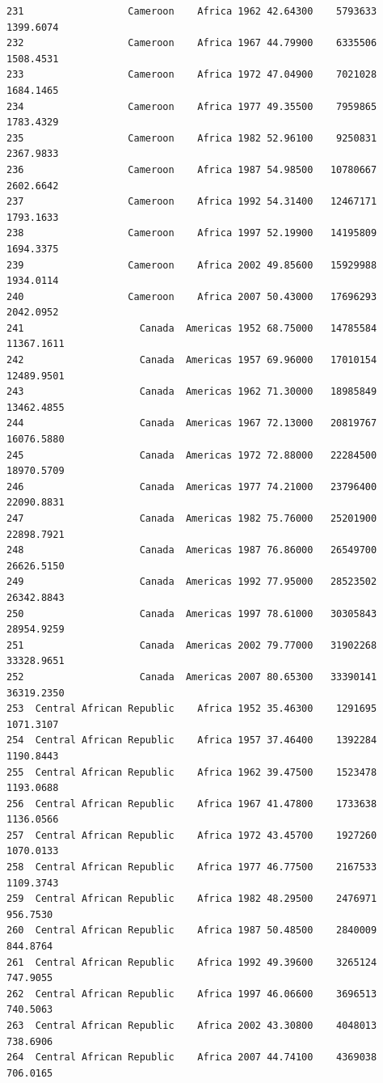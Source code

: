 \documentclass[
  letterpaper,
  DIV=11,
  numbers=noendperiod]{scrreprt}
\begin{document}
\begin{verbatim}
231                  Cameroon    Africa 1962 42.64300    5793633   1399.6074
232                  Cameroon    Africa 1967 44.79900    6335506   1508.4531
233                  Cameroon    Africa 1972 47.04900    7021028   1684.1465
234                  Cameroon    Africa 1977 49.35500    7959865   1783.4329
235                  Cameroon    Africa 1982 52.96100    9250831   2367.9833
236                  Cameroon    Africa 1987 54.98500   10780667   2602.6642
237                  Cameroon    Africa 1992 54.31400   12467171   1793.1633
238                  Cameroon    Africa 1997 52.19900   14195809   1694.3375
239                  Cameroon    Africa 2002 49.85600   15929988   1934.0114
240                  Cameroon    Africa 2007 50.43000   17696293   2042.0952
241                    Canada  Americas 1952 68.75000   14785584  11367.1611
242                    Canada  Americas 1957 69.96000   17010154  12489.9501
243                    Canada  Americas 1962 71.30000   18985849  13462.4855
244                    Canada  Americas 1967 72.13000   20819767  16076.5880
245                    Canada  Americas 1972 72.88000   22284500  18970.5709
246                    Canada  Americas 1977 74.21000   23796400  22090.8831
247                    Canada  Americas 1982 75.76000   25201900  22898.7921
248                    Canada  Americas 1987 76.86000   26549700  26626.5150
249                    Canada  Americas 1992 77.95000   28523502  26342.8843
250                    Canada  Americas 1997 78.61000   30305843  28954.9259
251                    Canada  Americas 2002 79.77000   31902268  33328.9651
252                    Canada  Americas 2007 80.65300   33390141  36319.2350
253  Central African Republic    Africa 1952 35.46300    1291695   1071.3107
254  Central African Republic    Africa 1957 37.46400    1392284   1190.8443
255  Central African Republic    Africa 1962 39.47500    1523478   1193.0688
256  Central African Republic    Africa 1967 41.47800    1733638   1136.0566
257  Central African Republic    Africa 1972 43.45700    1927260   1070.0133
258  Central African Republic    Africa 1977 46.77500    2167533   1109.3743
259  Central African Republic    Africa 1982 48.29500    2476971    956.7530
260  Central African Republic    Africa 1987 50.48500    2840009    844.8764
261  Central African Republic    Africa 1992 49.39600    3265124    747.9055
262  Central African Republic    Africa 1997 46.06600    3696513    740.5063
263  Central African Republic    Africa 2002 43.30800    4048013    738.6906
264  Central African Republic    Africa 2007 44.74100    4369038    706.0165

\end{verbatim}
\end{document}
